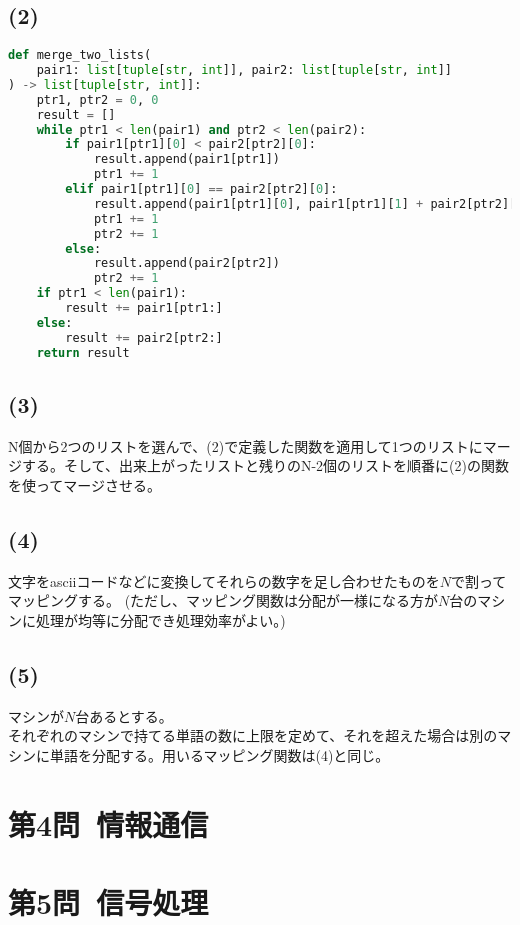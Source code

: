 \documentclass[a4paper,12pt,xelatex,ja=standard]{bxjsarticle}
\begin{document}
\newpage
\subsection*{(2)}
\begin{lstlisting}[language=Python]
def merge_two_lists(
    pair1: list[tuple[str, int]], pair2: list[tuple[str, int]]
) -> list[tuple[str, int]]:
    ptr1, ptr2 = 0, 0
    result = []
    while ptr1 < len(pair1) and ptr2 < len(pair2):
        if pair1[ptr1][0] < pair2[ptr2][0]:
            result.append(pair1[ptr1])
            ptr1 += 1
        elif pair1[ptr1][0] == pair2[ptr2][0]:
            result.append(pair1[ptr1][0], pair1[ptr1][1] + pair2[ptr2][1])
            ptr1 += 1
            ptr2 += 1
        else:
            result.append(pair2[ptr2])
            ptr2 += 1
    if ptr1 < len(pair1):
        result += pair1[ptr1:]
    else:
        result += pair2[ptr2:]
    return result

\end{lstlisting}

\subsection*{(3)}
N個から2つのリストを選んで、(2)で定義した関数を適用して1つのリストにマージする。そして、出来上がったリストと残りのN-2個のリストを順番に(2)の関数を使ってマージさせる。

\subsection*{(4)}
文字をasciiコードなどに変換してそれらの数字を足し合わせたものを$N$で割ってマッピングする。
(ただし、マッピング関数は分配が一様になる方が$N$台のマシンに処理が均等に分配でき処理効率がよい。)

\subsection*{(5)}
マシンが$N$台あるとする。\\
それぞれのマシンで持てる単語の数に上限を定めて、それを超えた場合は別のマシンに単語を分配する。用いるマッピング関数は(4)と同じ。

\section*{第4問\ 情報通信}

\section*{第5問\ 信号処理}
\end{document}
